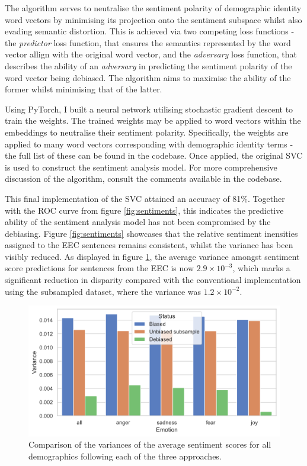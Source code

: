 \documentclass[a4paper]{IEEEtran}
\begin{document}
The algorithm serves to neutralise the sentiment polarity of demographic identity word vectors by minimising its projection onto the sentiment subspace whilst also evading semantic distortion. This is achieved via two competing loss functions - the \textit{predictor} loss function, that ensures the semantics represented by the word vector allign  with the original word vector, and the \textit{adversary} loss function, that describes the ability of an \textit{adversary} in predicting the sentiment polarity of the word vector being debiased. The algorithm aims to maximise the ability of the former whilst minimising that of the latter. 

Using PyTorch, I built a neural network utilising stochastic gradient descent to train the weights. The trained weights may be applied to word vectors within the embeddings to neutralise their sentiment polarity. Specifically, the weights are applied to many word vectors corresponding with demographic identity terms - the full list of these can be found in the codebase. Once applied, the original SVC is used to construct the sentiment analysis model. For more comprehensive discussion of the algorithm, consult the comments available in the codebase. 

This final implementation of the SVC attained an accuracy of 81\%. Together with the ROC curve from figure \ref{fig:sentiments}, this indicates the predictive ability of the sentiment analysis model has not been compromised by the debiasing. Figure \ref{fig:sentiments} showcases that the relative sentiment inensities assigned to the EEC sentences remains consistent, whilst the variance has been visibly reduced. As displayed in figure \ref{fig:variances}, the average variance amongst sentiment score predictions for sentences from the EEC is now $2.9\times10^{-3}$, which marks a significant reduction in disparity compared with the  conventional implementation using the subsampled dataset, where the variance was $1.2\times10^{-2}$. %

\begin{figure}[htbp]
\centerline{\includegraphics[width=0.85\linewidth]{images/variance-comparison.png}}
\caption{Comparison of the variances of the average sentiment scores for all demographics following each of the three approaches.}
\label{fig:variances}
\end{figure}
\end{document}
